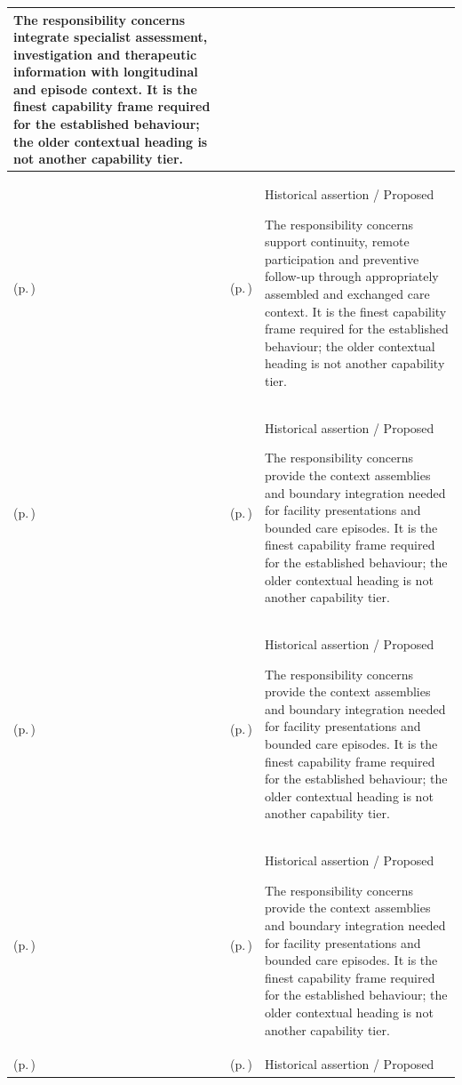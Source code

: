 \begin{longtable}{|>{\raggedright\arraybackslash}p{0.27\TableWidth}|>{\raggedright\arraybackslash}p{0.27\TableWidth}|>{\raggedright\arraybackslash}p{0.46\TableWidth}|}
The responsibility concerns integrate specialist assessment, investigation and therapeutic information with longitudinal and episode context. It is the finest capability frame required for the established behaviour; the older contextual heading is not another capability tier.\\\hline
\nameref{cap:bec-longitudinal-community-care-integration} (p.\,\pageref{cap:bec-longitudinal-community-care-integration}) & \nameref{cap:bec-primary-care} (p.\,\pageref{cap:bec-primary-care}) & Historical assertion / Proposed

The responsibility concerns support continuity, remote participation and preventive follow-up through appropriately assembled and exchanged care context. It is the finest capability frame required for the established behaviour; the older contextual heading is not another capability tier.\\\hline
\nameref{cap:bec-facility-episodic-care-integration} (p.\,\pageref{cap:bec-facility-episodic-care-integration}) & \nameref{cap:bec-acute-care} (p.\,\pageref{cap:bec-acute-care}) & Historical assertion / Proposed

The responsibility concerns provide the context assemblies and boundary integration needed for facility presentations and bounded care episodes. It is the finest capability frame required for the established behaviour; the older contextual heading is not another capability tier.\\\hline
\nameref{cap:bec-facility-episodic-care-integration} (p.\,\pageref{cap:bec-facility-episodic-care-integration}) & \nameref{cap:bec-emergency-care} (p.\,\pageref{cap:bec-emergency-care}) & Historical assertion / Proposed

The responsibility concerns provide the context assemblies and boundary integration needed for facility presentations and bounded care episodes. It is the finest capability frame required for the established behaviour; the older contextual heading is not another capability tier.\\\hline
\nameref{cap:bec-facility-episodic-care-integration} (p.\,\pageref{cap:bec-facility-episodic-care-integration}) & \nameref{cap:bec-inpatient-care} (p.\,\pageref{cap:bec-inpatient-care}) & Historical assertion / Proposed

The responsibility concerns provide the context assemblies and boundary integration needed for facility presentations and bounded care episodes. It is the finest capability frame required for the established behaviour; the older contextual heading is not another capability tier.\\\hline
\nameref{cap:bec-facility-episodic-care-integration} (p.\,\pageref{cap:bec-facility-episodic-care-integration}) & \nameref{cap:bec-ambulatory-care} (p.\,\pageref{cap:bec-ambulatory-care}) & Historical assertion / Proposed


\end{longtable}
